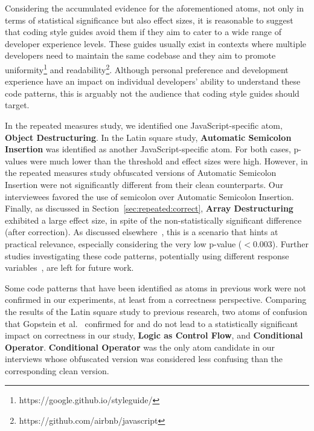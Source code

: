 Considering the accumulated evidence for the aforementioned atoms, not only in terms of statistical significance but also effect sizes, it is reasonable to suggest that coding style guides avoid them if they aim to cater to a wide range of developer experience levels. These guides usually exist in contexts where multiple developers need to maintain the same codebase and they aim to promote uniformity\footnote{https://google.github.io/styleguide/} and readability\footnote{https://github.com/airbnb/javascript}. Although personal preference and development experience have an impact on individual developers' ability to understand these code patterns, this is arguably not the audience that coding style guides should target. 

In the repeated measures study, we identified one JavaScript-specific atom, \textbf{Object Destructuring}. In the Latin square study, \textbf{Automatic Semicolon Insertion} was identified as another JavaScript-specific atom. For both cases, p-values were much lower than the threshold and effect sizes were high. However, in the repeated measures study obfuscated versions of Automatic Semicolon Insertion were not significantly different from their clean counterparts. Our interviewees favored the use of semicolon over Automatic Semicolon Insertion. Finally, as discussed in Section~\ref{sec:repeated:correct}, \textbf{Array Destructuring} exhibited a large effect size, in spite of the non-statistically significant difference (after correction). As discussed elsewhere~\cite{Ellis:2010:EGE}, this is a scenario that hints at practical relevance, especially considering the very low p-value ($< 0.003$). Further studies investigating these code patterns, potentially using different response variables~\cite{Oliveira:2020:ECR,Feitelson:2021:CPC}, are left for future work. 

Some code patterns that have been identified as atoms in previous work were not confirmed in our experiments, at least from a correctness perspective. Comparing the results of the Latin square study to previous research, two atoms of confusion that Gopstein et al.~\cite{DBLP:conf/sigsoft/GopsteinIYDZYC17} confirmed for \clang and \cpplang do not lead to a statistically significant impact on correctness in our study, \textbf{Logic as Control Flow}, and \textbf{Conditional Operator}. \textbf{Conditional Operator} was the only atom candidate in our interviews whose obfuscated version was considered less confusing than the corresponding clean version. 

